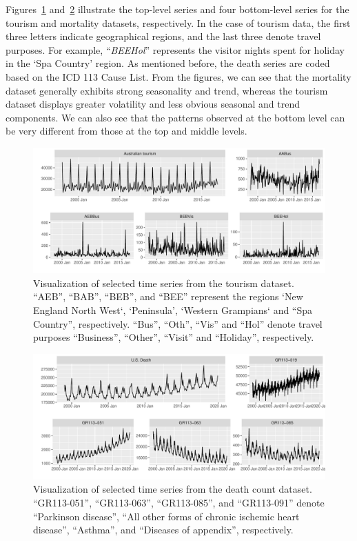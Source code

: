 \documentclass[a4paper,review,12pt,authoryear]{elsarticle}
\let\code=\texttt
\begin{document}
Figures~\ref{fig:tourism} and~\ref{fig:mortality} illustrate the top-level series and four bottom-level series for the tourism and mortality datasets, respectively. 
In the case of tourism data, the first three letters indicate geographical regions, and the last three denote travel purposes. For example, ``\textit{BEEHol}'' represents the visitor nights spent for holiday in the `Spa Country' region. As mentioned before, the death series are coded based on the ICD 113 Cause List. From the figures, we can see that the mortality dataset generally exhibits strong seasonality and trend, whereas the tourism dataset displays greater volatility and less obvious seasonal and trend components. We can also see that the patterns observed at the bottom level can be very different from those at the top and middle levels.



\begin{figure}
    \centering
    \includegraphics[width=\textwidth]{figures/tourism.pdf}
    \caption{Visualization of selected time series from the tourism dataset. ``AEB'', ``BAB'', ``BEB'', and ``BEE'' represent the regions `New England North West`, `Peninsula', `Western Grampians` and ``Spa Country'', respectively. ``Bus'', ``Oth'', ``Vis'' and ``Hol'' denote travel purposes ``Business'', ``Other'', ``Visit'' and ``Holiday'', respectively.}
    \label{fig:tourism}
\end{figure}

\begin{figure}
    \centering
    \includegraphics[width=\textwidth]{figures/mortality.pdf}
    \caption{{Visualization of selected time series from the death count dataset.} ``GR113-051'',  ``GR113-063'', ``GR113-085'', and ``GR113-091'' denote ``Parkinson disease'', ``All other forms of chronic ischemic heart disease'', ``Asthma'', and ``Diseases of appendix'', respectively.}
    \label{fig:mortality}
\end{figure}
\end{document}
